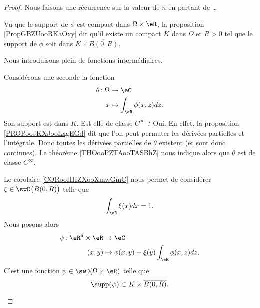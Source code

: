 \begin{proof}
	Nous faisons une récurrence sur la valeur de \( n\) en partant de \ldots
	\begin{subproof}
		\spitem[\( n=1\)]
		Vu que le support de \( \phi\) est compact dans \( \Omega\times \eR\), la proposition \ref{PropGBZUooRKaOxy} dit qu'il existe un compact \( K\) dans \( \Omega\) et \( R>0\) tel que le support de \( \phi\) soit dans \( K\times \overline{ B(0,R) }\).

		Nous introduisons plein de fonctions intermédiaires.
		\begin{subproof}


			Considérons une seconde la fonction
			\begin{equation}
				\begin{aligned}
					\theta\colon \Omega & \to \eC                        \\
					x                   & \mapsto \int_{\eR}\phi(x,z)dz.
				\end{aligned}
			\end{equation}
			Son support est dans \( K\). Est-elle de classe \(  C^{\infty}\) ? Oui. En effet, la proposition \ref{PROPooJKXJooLxgEGd} dit que l'on peut permuter les dérivées partielles et l'intégrale. Donc toutes les dérivées partielles de \( \theta\) existent (et sont donc continues). Le théorème \ref{THOooPZTAooTASBhZ} nous indique alors que \( \theta\) est de classe \( C^{\infty}\).

			\spitem[La fonction \( \xi\)]
			Le corolaire \ref{CORooHHZXooXmwGmC} nous permet de considérer \( \xi\in \swD\big( B(0,R) \big)\) telle que
			\begin{equation}
				\int_{\eR}\xi(x)dx=1.
			\end{equation}
			Nous posons alors
			\begin{equation}
				\begin{aligned}
					\psi\colon \eR^d\times \eR & \to \eC                                        \\
					(x,y)                      & \mapsto \phi(x,y)-\xi(y)\int_{\eR}\phi(x,z)dz.
				\end{aligned}
			\end{equation}
			C'est une fonction \( \psi\in \swD(\Omega\times \eR)\) telle que
			\begin{equation}
				\supp(\psi)\subset K\times \overline{ B(0,R) }.
			\end{equation}


\end{subproof}
\end{subproof}
\end{proof}
